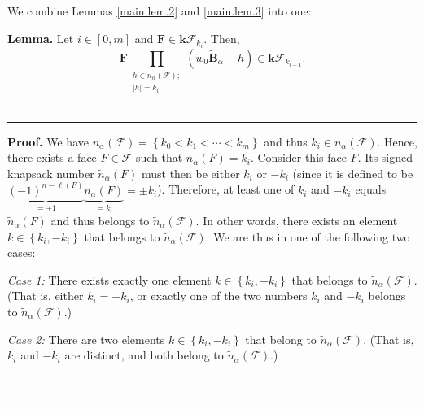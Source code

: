 \documentclass[12pt]{article}
\theoremstyle{definition}%
\newtheorem{lem}[thm]{Lemma}
\theoremstyle{definition}%
\theoremstyle{remark}%
\newcommand{\tup}[1]{\left( #1 \right)}
\newcommand{\interval}[1]{\left[ #1 \right]} %
\newcommand{\set}[1]{\left\{ #1 \right\}}
\newcommand{\abs}[1]{\left| #1 \right|} %
\newcommand{\kk}{\mathbf{k}}
\newcommand{\kf}{\kk\mathcal{F}}
\newcommand{\BBta}{\widetilde{\mathbf{B}}_{\alpha}}
\newcommand{\FF}{\mathbf{F}}
\newcommand{\CF}{\mathcal{F}}
\newcommand{\wotil}{\widetilde{w}_0}
\newcommand{\na}{n_{ \alpha } }%
\newcommand{\nna}{\widetilde{n}_{ \alpha } }%
\newcommand{\jonathan}[1]{\todo[size=\small,color=yellow!30,inline]{#1 \\ \hfill --- Jonathan}}
\newenvironment{lem}[1][Lemma]{\noindent\textbf{#1.} }{\ \rule{0.5em}{0.5em}}
\newenvironment{proof}[1][Proof]{\noindent\textbf{#1.} }{\ \rule{0.5em}{0.5em}}
\begin{document}
We combine Lemmas \ref{main.lem.2} and \ref{main.lem.3} into one:

\begin{lem}
\label{lem.main.last}
Let $i \in \interval{0, m}$ and $\FF \in \kf_{k_i}$. Then,
\[
\FF\prod_{\substack{h \in \nna\tup{\CF};\\
\abs{h} = k_i}}
\left(  \wotil \BBta -h\right)
\in \kf_{k_{i+1}}.
\]
\end{lem}

\begin{proof}
We have $\na\tup{\CF} = \set{ k_{0}<k_1<\cdots<k_{m} }$
and thus $k_i \in \na\tup{\CF}$.
Hence, there exists a face $F\in \CF$ such that
$\na\tup{F} = k_i$. Consider this face $F$.
Its signed knapsack number $\nna \tup{F}$
must then be either $k_i$ or $-k_i$
(since it is defined to be  $\underbrace{\tup{-1}^{n-\ell\left(
F\right)  }}_{=\pm 1}\underbrace{\na\tup{F}  }_{=k_i}=\pm
k_i$). Therefore, at least one of $k_i$ and $-k_i$
equals $\nna\tup{F}$ and thus belongs to $\nna\tup{\CF}$.
In other words, there exists an element
$k\in \set{k_i, -k_i}$ that belongs to $\nna\tup{\CF}$.
We are thus in one of the following two cases:

\textit{Case 1:} There exists exactly one element $k\in
\set{k_i, -k_i}$ that belongs to $\nna\tup{\CF}$.
(That is, either $k_i = -k_i$, or exactly one of
the two numbers $k_i$ and $-k_i$ belongs to $\nna\tup{\CF}$.)

\textit{Case 2:} There are two elements $k\in
\set{k_i, -k_i}$ that belong to $\nna\tup{\CF}$.
(That is, $k_i$ and $-k_i$ are distinct, and both
belong to $\nna\tup{\CF}$.)



\end{proof}
\end{document}
